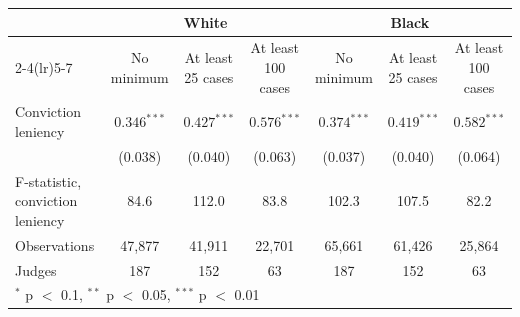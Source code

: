\begin{tabular}{lcccccc}
\toprule
 & \multicolumn{3}{c}{White} & \multicolumn{3}{c}{Black} \\
\cmidrule(lr){2-4}\cmidrule(lr){5-7}
 & No minimum & At least 25 cases & At least 100 cases & No minimum & At least 25 cases & At least 100 cases \\
\midrule
Conviction leniency & $0.346^{***}$ & $0.427^{***}$ & $0.576^{***}$ & $0.374^{***}$ & $0.419^{***}$ & $0.582^{***}$ \\
 & (0.038) & (0.040) & (0.063) & (0.037) & (0.040) & (0.064) \\
\midrule
F-statistic, conviction leniency & 84.6 & 112.0 & 83.8 & 102.3 & 107.5 & 82.2 \\
Observations & 47,877 & 41,911 & 22,701 & 65,661 & 61,426 & 25,864 \\
Judges & 187 & 152 & 63 & 187 & 152 & 63 \\
\bottomrule
\multicolumn{7}{l}{\footnotesize $^{*}$ p $<$ 0.1, $^{**}$ p $<$ 0.05, $^{***}$ p $<$ 0.01} \\
\end{tabular}
